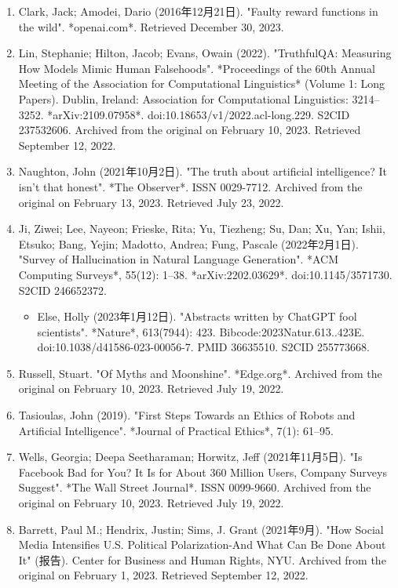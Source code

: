 \begin{enumerate}
\item Clark, Jack; Amodei, Dario (2016年12月21日). "Faulty reward functions in the wild". *openai.com*. Retrieved December 30, 2023.
\item Lin, Stephanie; Hilton, Jacob; Evans, Owain (2022). "TruthfulQA: Measuring How Models Mimic Human Falsehoods". *Proceedings of the 60th Annual Meeting of the Association for Computational Linguistics* (Volume 1: Long Papers). Dublin, Ireland: Association for Computational Linguistics: 3214–3252. *arXiv:2109.07958*. doi:10.18653/v1/2022.acl-long.229. S2CID 237532606. Archived from the original on February 10, 2023. Retrieved September 12, 2022.
\item Naughton, John (2021年10月2日). "The truth about artificial intelligence? It isn't that honest". *The Observer*. ISSN 0029-7712. Archived from the original on February 13, 2023. Retrieved July 23, 2022.
\item Ji, Ziwei; Lee, Nayeon; Frieske, Rita; Yu, Tiezheng; Su, Dan; Xu, Yan; Ishii, Etsuko; Bang, Yejin; Madotto, Andrea; Fung, Pascale (2022年2月1日). "Survey of Hallucination in Natural Language Generation". *ACM Computing Surveys*, 55(12): 1–38. *arXiv:2202.03629*. doi:10.1145/3571730. S2CID 246652372.
\begin{itemize}
\item Else, Holly (2023年1月12日). "Abstracts written by ChatGPT fool scientists". *Nature*, 613(7944): 423. Bibcode:2023Natur.613..423E. doi:10.1038/d41586-023-00056-7. PMID 36635510. S2CID 255773668.
\end{itemize}
\item Russell, Stuart. "Of Myths and Moonshine". *Edge.org*. Archived from the original on February 10, 2023. Retrieved July 19, 2022.
\item Tasioulas, John (2019). "First Steps Towards an Ethics of Robots and Artificial Intelligence". *Journal of Practical Ethics*, 7(1): 61–95.
\item Wells, Georgia; Deepa Seetharaman; Horwitz, Jeff (2021年11月5日). "Is Facebook Bad for You? It Is for About 360 Million Users, Company Surveys Suggest". *The Wall Street Journal*. ISSN 0099-9660. Archived from the original on February 10, 2023. Retrieved July 19, 2022.
\item Barrett, Paul M.; Hendrix, Justin; Sims, J. Grant (2021年9月). "How Social Media Intensifies U.S. Political Polarization-And What Can Be Done About It" (报告). Center for Business and Human Rights, NYU. Archived from the original on February 1, 2023. Retrieved September 12, 2022.

\end{enumerate}
